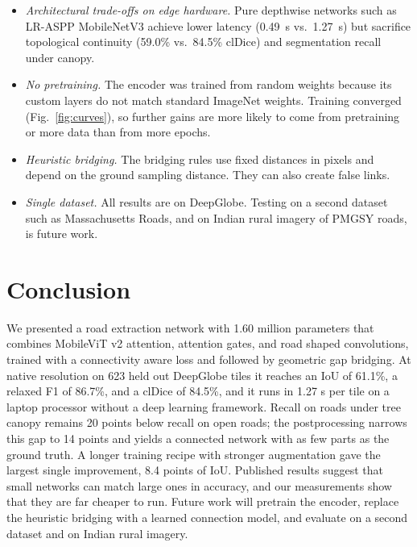 \documentclass{ieeeaccess}
\begin{document}
\begin{itemize}

\item \emph{Architectural trade-offs on edge hardware.} Pure depthwise networks such as LR-ASPP MobileNetV3 achieve lower latency (0.49~s vs.\ 1.27~s) but sacrifice topological continuity (59.0\% vs.\ 84.5\% clDice) and segmentation recall under canopy.

\item \emph{No pretraining.} The encoder was trained from random weights because its custom layers do not match standard ImageNet weights. Training converged (Fig.~\ref{fig:curves}), so further gains are more likely to come from pretraining or more data than from more epochs.

\item \emph{Heuristic bridging.} The bridging rules use fixed distances in pixels and depend on the ground sampling distance. They can also create false links.

\item \emph{Single dataset.} All results are on DeepGlobe. Testing on a second dataset such as Massachusetts Roads, and on Indian rural imagery of PMGSY roads, is future work.

\end{itemize}

\section{Conclusion}
\label{sec:conclusion}

We presented a road extraction network with 1.60 million parameters that combines MobileViT v2 attention, attention gates, and road shaped convolutions, trained with a connectivity aware loss and followed by geometric gap bridging. At native resolution on 623 held out DeepGlobe tiles it reaches an IoU of 61.1\%, a relaxed F1 of 86.7\%, and a clDice of 84.5\%, and it runs in 1.27 s per tile on a laptop processor without a deep learning framework. Recall on roads under tree canopy remains 20 points below recall on open roads; the postprocessing narrows this gap to 14 points and yields a connected network with as few parts as the ground truth. A longer training recipe with stronger augmentation gave the largest single improvement, 8.4 points of IoU. Published results suggest that small networks can match large ones in accuracy, and our measurements show that they are far cheaper to run. Future work will pretrain the encoder, replace the heuristic bridging with a learned connection model, and evaluate on a second dataset and on Indian rural imagery.
\end{document}
